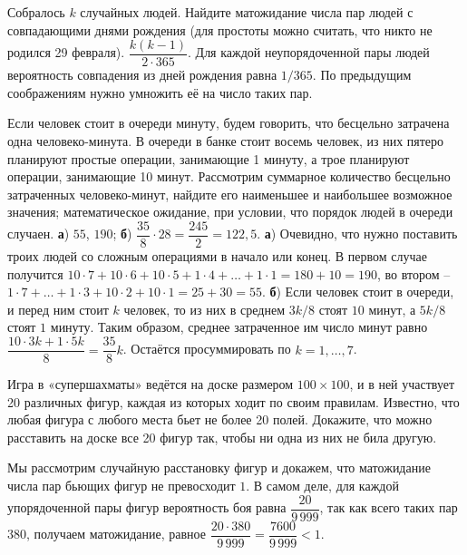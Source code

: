 \documentclass[a4paper,11pt]{article}
\begin{document}
Собралось $k$ случайных людей.
Найдите матожидание числа пар людей с совпадающими днями рождения (для простоты можно считать, что никто не родился 29 февраля).
$\dfrac{k(k-1)}{2 \cdot 365}$.
Для каждой неупорядоченной пары людей вероятность совпадения из дней рождения равна $1/365$. По предыдущим соображениям нужно умножить её на число таких пар.











Если человек стоит в очереди минуту, будем говорить, что бесцельно затрачена одна человеко-минута. В очереди в банке стоит восемь человек, из них пятеро планируют простые операции, занимающие 1 минуту, а трое планируют операции, занимающие 10 минут.
Рассмотрим суммарное количество бесцельно затраченных человеко-минут, найдите его
 наименьшее и наибольшее возможное значения;
 математическое ожидание, при условии, что порядок людей в очереди случаен.
\textbf{а}) $55$, $190$; \textbf{б}) $\dfrac{35}{8} \cdot 28 =\dfrac{245}{2} = 122{,}5$.
\textbf{а}) Очевидно, что нужно поставить троих людей со сложным операциями в начало или конец. В первом случае получится $10 \cdot 7 + 10 \cdot 6 + 10 \cdot 5 + 1 \cdot 4 + \ldots + 1 \cdot 1 = 180+10=190$, во втором -- $1 \cdot 7 + \ldots + 1 \cdot 3 + 10 \cdot 2 + 10 \cdot 1 = 25+30=55$.
\textbf{б}) Если человек стоит в очереди, и перед ним стоит $k$ человек, то из них в среднем $3k/8$ стоят $10$ минут, а $5k/8$ стоят $1$ минуту. Таким образом, среднее затраченное им число минут равно $\dfrac{10 \cdot 3k+1 \cdot 5k}{8} = \dfrac{35}{8} k$. Остаётся просуммировать по $k=1,\ldots,7$.









Игра в «супершахматы» ведётся на доске размером $100\times100$, и в ней участвует 20 различных фигур, каждая из которых ходит по своим правилам.
Известно, что любая фигура с любого места бьет не более 20 полей.
Докажите, что можно расставить на доске все 20 фигур так, чтобы ни одна из них не била другую.

Мы рассмотрим случайную расстановку фигур и докажем, что матожидание числа пар бьющих фигур не превосходит $1$. В самом деле, для каждой упорядоченной пары фигур вероятность боя равна $\dfrac{20}{9\,999}$, так как всего таких пар $380$, получаем матожидание, равное $\dfrac{20\cdot 380}{9\,999}=\dfrac{7600}{9\,999} < 1$.
\end{document}
